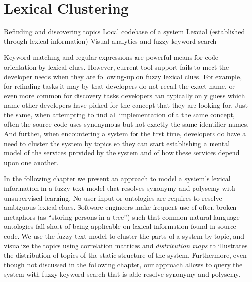 

\chapter{Lexical Clustering}
\label{the chapter on hapax}

\infobox
	{Refinding and discovering topics}
	{Local codebase of a system}
	{Lexcial (established through lexical information)}
	{Visual analytics and fuzzy keyword search}

Keyword matching and regular expressions are powerful means for code orientation by lexical clues. However, current tool support fails to meet the developer needs when they are following-up on fuzzy lexical clues. For example, for refinding tasks it may by that developers do not recall the exact name, or even more common for discovery tasks developers can typically only guess which name other developers have picked for the concept that they are looking for. Just the same, when attempting to find all implementation of a the same concept, often the source code uses synonymous but not exactly the same identifier names. And further, when encountering a system for the first time, developers do have a need to cluster the system by topics so they can start establishing a mental model of the services provided by the system and of how these services depend upon one another. 

In the following chapter we present an approach to model a system's lexical information in a fuzzy text model that resolves synonymy and polysemy with unsupervised learning. No user input or ontologies are requires to resolve ambiguous lexical clues. Software engineers make frequent use of often broken metaphors (as \eg ``storing persons in a tree'') such that common natural language ontologies fall short of being applicable on lexical information found in source code. We use the fuzzy text model to cluster the parts of a system by topic, and visualize the topics using correlation matrices and \emph{distribution maps} to illustrates the distribution of topics of the static structure of the system. Furthermore, even though not discussed in the following chapter, our approach allows to query the system with fuzzy keyword search that is able resolve synonymy and polysemy.

